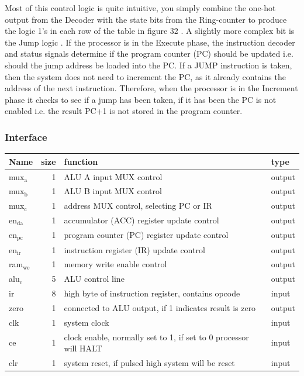 \documentclass[11pt]{article}
\begin{document}
Most of this control logic is quite intuitive, you simply combine the one-hot output from the Decoder with the state bits from the Ring-counter to produce the logic 1's in each row of the table in figure 32 . A slightly more complex bit is the Jump logic . If the processor is in the Execute phase, the instruction decoder and status signals determine if the program counter (PC) should be updated i.e. should the jump address be loaded into the PC. If a JUMP instruction is taken, then the system does not need to increment the PC, as it already contains the address of the next instruction. Therefore, when the processor is in the Increment phase it checks to see if a jump has been taken, if it has been the PC is not enabled i.e. the result PC+1 is not stored in the program counter.




\subsubsection{Interface}
\label{sec:orgaeea059}
\begin{center}
\begin{tabular}{lrll}
Name & size & function & type\\
\hline
mux\(_{\text{a}}\) & 1 & ALU A input MUX control & output\\
mux\(_{\text{b}}\) & 1 & ALU B input MUX control & output\\
mux\(_{\text{c}}\) & 1 & address MUX control, selecting PC or IR & output\\
en\(_{\text{da}}\) & 1 & accumulator (ACC) register update control & output\\
en\(_{\text{pc}}\) & 1 & program counter (PC) register update control & output\\
en\(_{\text{ir}}\) & 1 & instruction register (IR) update control & output\\
ram\(_{\text{we}}\) & 1 & memory write enable control & output\\
alu\(_{\text{c}}\) & 5 & ALU control line & output\\
ir & 8 & high byte of instruction register, contains opcode & input\\
zero & 1 & connected to ALU output, if 1 indicates result is zero & output\\
clk & 1 & system clock & input\\
ce & 1 & clock enable, normally set to 1, if set to 0 processor will HALT & input\\
clr & 1 & system reset, if pulsed high system will be reset & input\\
\hline
\end{tabular}
\end{center}
\end{document}
